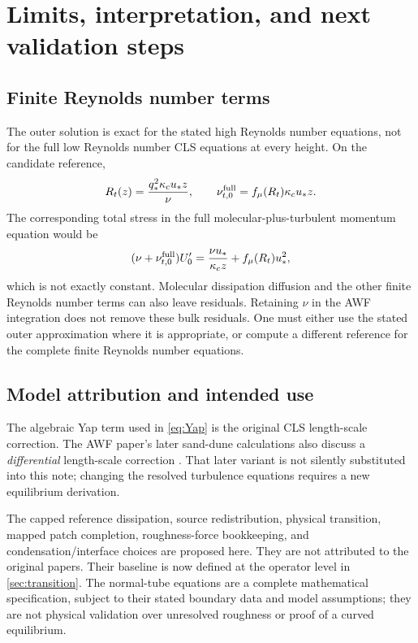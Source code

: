 \documentclass[11pt,a4paper]{article}
\numberwithin{equation}{section}
\newcommand{\ust}{u_*}
\newcommand{\kc}{\kappa_c}
\newcommand{\qs}{q_*}
\begin{document}
\section{Limits, interpretation, and next validation steps}
\label{sec:limits}
\subsection{Finite Reynolds number terms}
The outer solution is exact for the stated high Reynolds number
equations, not for the full low Reynolds number CLS equations at every
height. On the candidate reference,
\begin{equation}
 R_t(z)=\frac{\qs^2\kc\ust z}{\nu},\qquad
 \nu_{t,0}^{\rm full}=f_\mu(R_t)\kc\ust z.
\label{eq:Rtref}
\end{equation}
The corresponding total stress in the full molecular-plus-turbulent
momentum equation would be
\begin{equation}
 (\nu+\nu_{t,0}^{\rm full})U_0'
 =\frac{\nu\ust}{\kc z}+f_\mu(R_t)\ust^2,
\label{eq:finiteRestress}
\end{equation}
which is not exactly constant. Molecular dissipation diffusion and the
other finite Reynolds number terms can also leave residuals.
Retaining $\nu$ in the AWF integration does not remove these bulk
residuals. One must either use the stated outer approximation where it
is appropriate, or compute a different reference for the complete
finite Reynolds number equations.

\subsection{Model attribution and intended use}
The algebraic Yap term used in \cref{eq:Yap} is the original CLS
length-scale correction. The AWF paper's later sand-dune calculations
also discuss a \emph{differential} length-scale correction
\cite[discussion of Fig.~14]{SCI2006}. That later variant is not
silently substituted into this note; changing the resolved turbulence
equations requires a new equilibrium derivation.

The capped reference dissipation, source redistribution, physical
transition, mapped patch completion, roughness-force bookkeeping,
and condensation/interface choices are proposed here. They are not
attributed to the original papers. Their baseline is now defined at
the operator level in \cref{sec:transition}. The normal-tube equations
are a complete mathematical specification, subject to their stated
boundary data and model assumptions; they are not physical validation
over unresolved roughness or proof of a curved equilibrium.
\end{document}
